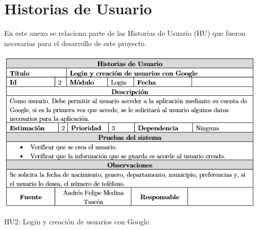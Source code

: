 \documentclass[12pt,letterpaper,openany]{book}
\begin{document}


\appendix
\chapter{Historias de Usuario}\label{aped.A}
En este anexo se relaciona parte de las Historias de Usuario (HU) que fueron necesarias para el desarrollo de este proyecto.	
\begin{table}[H]
\centering
\includegraphics[width=13cm]{./imagenes/HU/HU2}
\caption{HU2: Login y creación de usuarios con Google.}
\end{table}
\end{document}
